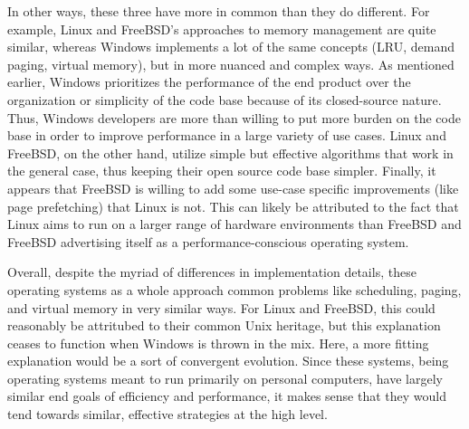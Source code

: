 \documentclass[onecolumn, draftclsnofoot,10pt, compsoc]{IEEEtran}
\begin{document}
In other ways, these three have more in common than they do different. For example, Linux and FreeBSD's approaches to memory management are quite similar, whereas Windows implements a lot of the same concepts (LRU, demand paging, virtual memory), but in more nuanced and complex ways. As mentioned earlier, Windows prioritizes the performance of the end product over the organization or simplicity of the code base because of its closed-source nature. Thus, Windows developers are more than willing to put more burden on the code base in order to improve performance in a large variety of use cases. Linux and FreeBSD, on the other hand, utilize simple but effective algorithms that work in the general case, thus keeping their open source code base simpler. Finally, it appears that FreeBSD is willing to add some use-case specific improvements (like page prefetching) that Linux is not. This can likely be attributed to the fact that Linux aims to run on a larger range of hardware environments than FreeBSD and FreeBSD advertising itself as a performance-conscious operating system.

Overall, despite the myriad of differences in implementation details, these operating systems as a whole approach common problems like scheduling, paging, and virtual memory in very similar ways. For Linux and FreeBSD, this could reasonably be attritubed to their common Unix heritage, but this explanation ceases to function when Windows is thrown in the mix. Here, a more fitting explanation would be a sort of convergent evolution. Since these systems, being operating systems meant to run primarily on personal computers, have largely similar end goals of efficiency and performance, it makes sense that they would tend towards similar, effective strategies at the high level. 
\newpage


\end{document}

